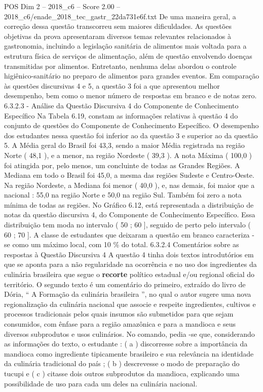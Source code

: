 \begin{textsample}{POS Dim 2 – 2018\_c6 – Score 2.00 – 2018\_c6/enade\_2018\_tec\_gastr\_22da731e6f.txt}
De uma maneira geral, a correção dessa questão transcorreu sem maiores dificuldades.
As questões objetivas da prova apresentaram diversos temas relevantes relacionados à gastronomia, incluindo a legislação sanitária de alimentos mais voltada para a estrutura física de serviços de alimentação, além de questão envolvendo doenças transmitidas por alimentos.
Entretanto, nenhuma delas abordou o controle higiênico-sanitário no preparo de alimentos para grandes eventos.
Em comparação às questões discursivas 4 e 5, a questão 3 foi a que apresentou melhor desempenho, bem como o menor número de respostas em branco e de notas zero. 6.3.2.3 - Análise da Questão Discursiva 4 do Componente de Conhecimento Específico Na Tabela 6.19, constam as informações relativas à questão 4 do conjunto de questões do Componente de Conhecimento Específico.
O desempenho dos estudantes nessa questão foi inferior ao da questão 3 e superior ao da questão 5.
A Média geral do Brasil foi 43,3, sendo a maior Média registrada na região Norte ( 48,1 ), e a menor, na região Nordeste ( 39,3 ).
A nota Máxima ( 100,0 ) foi atingida por, pelo menos, um concluinte de todas as Grandes Regiões.
A Mediana em todo o Brasil foi 45,0, a mesma das regiões Sudeste e Centro-Oeste.
Na região Nordeste, a Mediana foi menor ( 40,0 ), e, nas demais, foi maior que a nacional : 55,0 na região Norte e 50,0 na região Sul.
Também foi zero a nota mínima de todas as regiões.
No Gráfico 6.12, está representada a distribuição de notas da questão discursiva 4, do Componente de Conhecimento Específico.
Essa distribuição tem moda no intervalo ( 50 ; 60 ], seguido de perto pelo intervalo ( 60 ; 70 ].
A classe de estudantes que deixaram a questão em branco caracteriza -se como um máximo local, com 10 \% do total. 6.3.2.4 Comentários sobre as respostas à Questão Discursiva 4 A questão 4 tinha dois textos introdutórios em que se aponta para a não regularidade na ocorrência e no uso dos ingredientes da culinária brasileira que segue o \textbf{recorte} político estadual e/ou regional oficial do território.
O segundo texto é um comentário do primeiro, extraído do livro de Dória, “ A Formação da culinária brasileira ”, no qual o autor sugere uma nova regionalização da culinária nacional que associe e respeite ingredientes, cultivos e processos tradicionais pelos quais insumos são submetidos para que sejam consumidos, com ênfase para a região amazônica e para a mandioca e seus diversos subprodutos e usos culinários.
No comando, pedia -se que, considerando as informações do texto, o estudante : ( a ) discorresse sobre a importância da mandioca como ingrediente tipicamente brasileiro e sua relevância na identidade da culinária tradicional do país ; ( b ) descrevesse o modo de preparação do tucupi e ( c ) citasse dois outros subprodutos da mandioca, explicando uma possibilidade de uso para cada um deles na culinária nacional.

\end{textsample}

